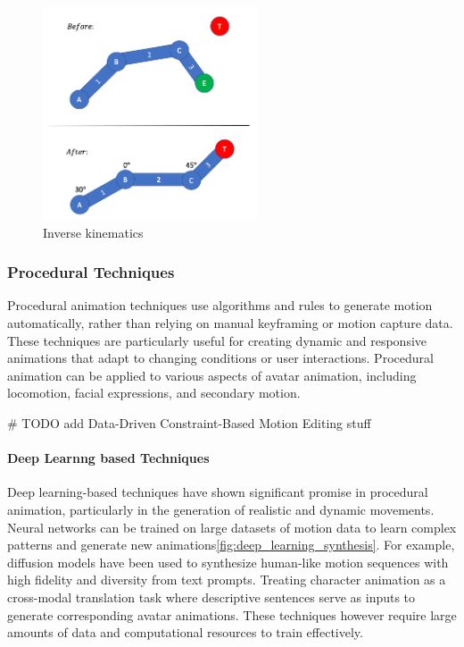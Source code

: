 \begin{figure}
  \centering \includegraphics[width = 2.5in]{images/background_work/inverse_kinematics_example.png}
  \caption{Inverse kinematics}
  \label{fig:inverse_kinematics_example}
\end{figure}

\subsubsection{Procedural Techniques}

Procedural animation techniques use algorithms and rules to generate motion automatically, rather than relying on manual keyframing or motion capture data. These techniques are particularly useful for creating dynamic and responsive animations that adapt to changing conditions or user interactions. Procedural animation can be applied to various aspects of avatar animation, including locomotion, facial expressions, and secondary motion.

# TODO add Data-Driven Constraint-Based Motion Editing stuff

\paragraph{Deep Learnng based Techniques}

Deep learning-based techniques have shown significant promise in procedural animation, particularly in the generation of realistic and dynamic movements. Neural networks can be trained on large datasets of motion data to learn complex patterns and generate new animations\ref{fig:deep_learning_synthesis}. For example, diffusion models\cite{TODO} have been used to synthesize human-like motion sequences with high fidelity and diversity from text prompts. Treating character animation as a cross-modal translation task where descriptive sentences serve as inputs to generate corresponding avatar animations. These techniques however require large amounts of data and computational resources to train effectively.

